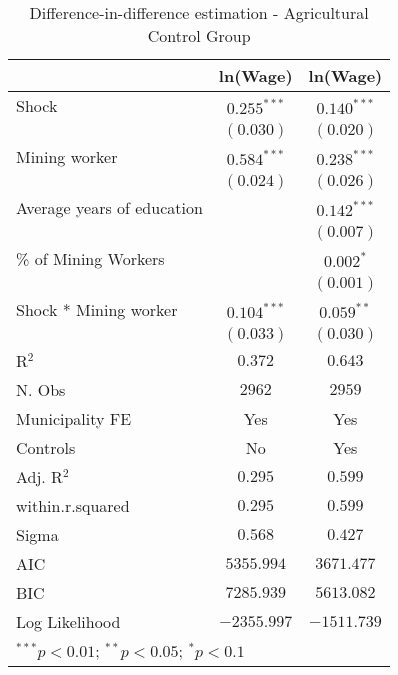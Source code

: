 
\begin{table}[H]
\caption{Difference-in-difference estimation - Agricultural Control Group}
\begin{center}
\begin{tabular}{l c c}
\hline
 & ln(Wage) & ln(Wage) \\
\hline
Shock                      & $0.255^{***}$ & $0.140^{***}$ \\
                           & $(0.030)$     & $(0.020)$     \\
Mining worker              & $0.584^{***}$ & $0.238^{***}$ \\
                           & $(0.024)$     & $(0.026)$     \\
Average years of education &               & $0.142^{***}$ \\
                           &               & $(0.007)$     \\
\% of Mining Workers       &               & $0.002^{*}$   \\
                           &               & $(0.001)$     \\
Shock * Mining worker      & $0.104^{***}$ & $0.059^{**}$  \\
                           & $(0.033)$     & $(0.030)$     \\
\hline
R$^2$                      & $0.372$       & $0.643$       \\
N. Obs                     & $2962$        & $2959$        \\
Municipality FE            & Yes           & Yes           \\
Controls                   & No            & Yes           \\
Adj. R$^2$                 & $0.295$       & $0.599$       \\
within.r.squared           & $0.295$       & $0.599$       \\
Sigma                      & $0.568$       & $0.427$       \\
AIC                        & $5355.994$    & $3671.477$    \\
BIC                        & $7285.939$    & $5613.082$    \\
Log Likelihood             & $-2355.997$   & $-1511.739$   \\
\hline
\multicolumn{3}{l}{\scriptsize{$^{***}p<0.01$; $^{**}p<0.05$; $^{*}p<0.1$}}
\end{tabular}
\label{table:coefficients}
\end{center}
\end{table}
